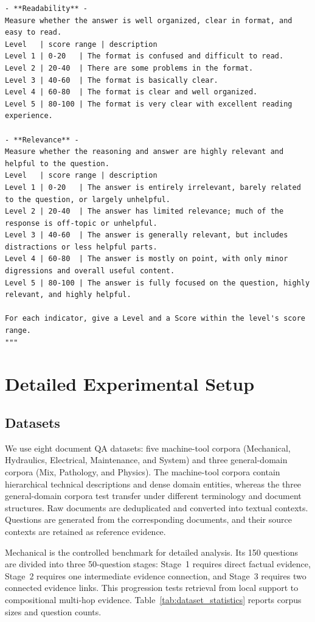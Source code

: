\documentclass{article} %
\begin{document}
\begin{lstlisting}
- **Readability** -
Measure whether the answer is well organized, clear in format, and easy to read.
Level   | score range | description
Level 1 | 0-20   | The format is confused and difficult to read.
Level 2 | 20-40  | There are some problems in the format.
Level 3 | 40-60  | The format is basically clear.
Level 4 | 60-80  | The format is clear and well organized.
Level 5 | 80-100 | The format is very clear with excellent reading experience.

- **Relevance** -
Measure whether the reasoning and answer are highly relevant and helpful to the question.
Level   | score range | description
Level 1 | 0-20   | The answer is entirely irrelevant, barely related to the question, or largely unhelpful.
Level 2 | 20-40  | The answer has limited relevance; much of the response is off-topic or unhelpful.
Level 3 | 40-60  | The answer is generally relevant, but includes distractions or less helpful parts.
Level 4 | 60-80  | The answer is mostly on point, with only minor digressions and overall useful content.
Level 5 | 80-100 | The answer is fully focused on the question, highly relevant, and highly helpful.

For each indicator, give a Level and a Score within the level's score range.
"""
\end{lstlisting}

\section{Detailed Experimental Setup}
\label{app:experimental_setup}

\subsection{Datasets}

We use eight document QA datasets: five machine-tool corpora (Mechanical, Hydraulics, Electrical, Maintenance, and System) and three general-domain corpora (Mix, Pathology, and Physics). The machine-tool corpora contain hierarchical technical descriptions and dense domain entities, whereas the three general-domain corpora test transfer under different terminology and document structures. Raw documents are deduplicated and converted into textual contexts. Questions are generated from the corresponding documents, and their source contexts are retained as reference evidence.

Mechanical is the controlled benchmark for detailed analysis. Its 150 questions are divided into three 50-question stages: Stage~1 requires direct factual evidence, Stage~2 requires one intermediate evidence connection, and Stage~3 requires two connected evidence links. This progression tests retrieval from local support to compositional multi-hop evidence. Table~\ref{tab:dataset_statistics} reports corpus sizes and question counts.
\end{document}
